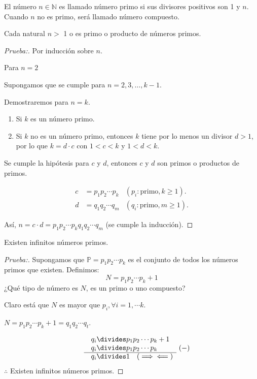 \documentclass[oneside,a5paper]{memoir}
\begin{document}
\begin{definition}

El número $n\in\mathbb{N}$ es llamado número primo si sus divisores positivos son 1 y $n$. Cuando $n$ no es primo, será llamado número compuesto. 

\end{definition}

\begin{theorem}
Cada natural $n>$ 1 o es primo o producto de números primos.

\begin{proof}[Prueba:]
Por inducción sobre $n$.

Para $n=2$ \checkmark

Supongamos que se cumple para $n=2,3,\ldots,k-1$.

Demostraremos para $n=k$.

\begin{enumerate}[font={\bfseries},label={*)}]

\item Si $k$ es un número primo.

\item Si $k$ no es un número primo, entonces $k$ tiene por lo menos un divisor $d>1$, por lo que $k=d\cdot c$ con $1<c<k$ y $1<d<k$.

\end{enumerate}

\noindent
Se cumple la hipótesis para $c$ y $d$, entonces $c$ y $d$ son primos o productos de primos.

\begin{align*}
c&=p_1p_2\cdots p_k&(p_i\colon\text{primo}, k\geq1).\\
d&=q_1q_2\cdots q_m&(q_i\colon\text{primo}, m\geq1).
\end{align*}

\noindent
Así, $n=c\cdot d=p_1p_2\cdots p_kq_1q_2\cdots q_m$ (se cumple la inducción).
\end{proof}
\end{theorem}

\begin{theorem}
Existen infinitos números primos.

\begin{proof}[Prueba:]

Supongamos que $\boxed{\mathbb{P}=p_1p_2\cdots p_k}$ es el conjunto  de todos los números primos que existen. Definimos:
\[N=p_1p_2\cdots p_k+1\]
¿Qué tipo de número es $N$, es un primo o uno compuesto?

\noindent
Claro está que $N$ es mayor que $p_i,\forall i=1,\cdots k$.

$N=p_1p_2\cdots p_k+1=q_1q_2\cdots q_t$.

\[\begin{array}{l@{\quad}cr@{}l}
&& q_i & {}\divides p_1p_2\cdots p_k+1 \\
&& q_i & {}\divides p_1p_2\cdots p_k \\ \cline{2-4}
&& q_i & {}\divides 1\quad(\implies\impliedby)
\end{array}\ (-)\]
$\therefore$ Existen infinitos números primos. %
\end{proof}

\end{theorem}
\end{document}
